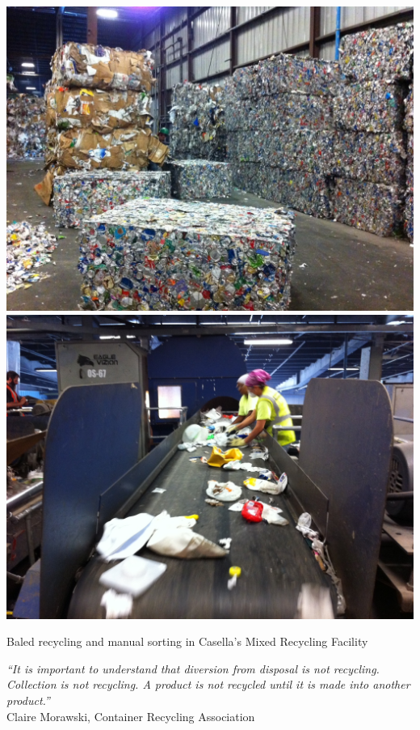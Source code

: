 \documentclass[nofonts,nols,justified,nobib]{tufte-book}
\begin{document}
\begin{marginfigure}
\includegraphics[width=\textwidth]{img/1/casella-bales.jpg}
\vspace{0.6cm}
\includegraphics[width=\textwidth]{img/1/casella-sorting.jpg}
\caption{Baled recycling and manual sorting in Casella's Mixed Recycling Facility \cite{delichatsios_trash_2011} \label{b}}
\end{marginfigure}

\begin{flushright}
\begin{flushright}
\emph{``It is important to understand that diversion from disposal is not recycling. Collection is not recycling. A product is not recycled until it is made into another product.''}\cite{morawski_understanding_2009}\\
Claire Morawski, Container Recycling Association
\end{flushright}
\end{flushright}
\end{document}
